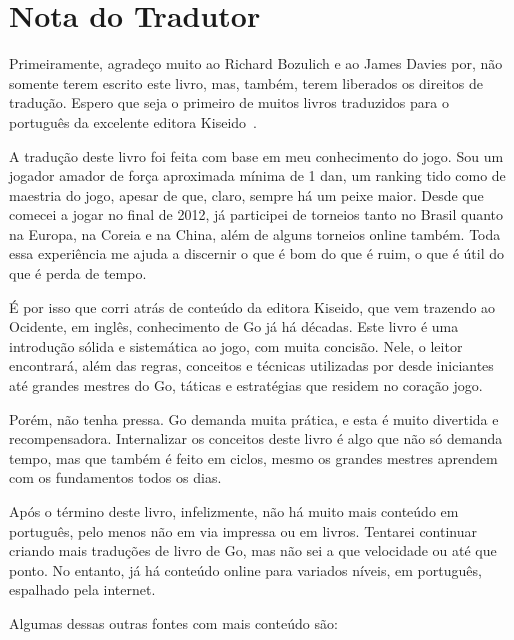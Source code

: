 \chapter{Nota do Tradutor}


Primeiramente, agradeço muito ao Richard Bozulich e ao James Davies por, não somente terem escrito este livro, mas, também, terem liberados os direitos de tradução. Espero que seja o primeiro de muitos livros traduzidos para o português da excelente editora Kiseido~\cite{kiseido}.

\bigskip

A tradução deste livro foi feita com base em meu conhecimento do jogo. Sou um jogador amador de força aproximada mínima de 1 dan, um ranking tido como de maestria do jogo, apesar de que, claro, sempre há um peixe maior. Desde que comecei a jogar no final de 2012, já participei de torneios tanto no Brasil quanto na Europa, na Coreia e na China, além de alguns torneios online também. Toda essa experiência me ajuda a discernir o que é bom do que é ruim, o que é útil do que é perda de tempo.

É por isso que corri atrás de conteúdo da editora Kiseido, que vem trazendo ao Ocidente, em inglês, conhecimento de Go já há décadas. Este livro é uma introdução sólida e sistemática ao jogo, com muita concisão. Nele, o leitor encontrará, além das regras, conceitos e técnicas utilizadas por desde iniciantes até grandes mestres do Go, táticas e estratégias que residem no coração jogo.

Porém, não tenha pressa. Go demanda muita prática, e esta é muito divertida e recompensadora. Internalizar os conceitos deste livro é algo que não só demanda tempo, mas que também é feito em ciclos, mesmo os grandes mestres aprendem com os fundamentos todos os dias.

\pagebreak

Após o término deste livro, infelizmente, não há muito mais conteúdo em português, pelo menos não em via impressa ou em livros. Tentarei continuar criando mais traduções de livro de Go, mas não sei a que velocidade ou até que ponto. No entanto, já há conteúdo online para variados níveis, em português, espalhado pela internet.

Algumas dessas outras fontes com mais conteúdo são:

